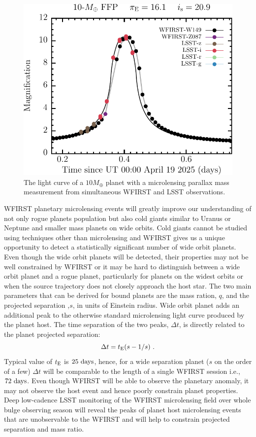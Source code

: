 \begin{figure}[t]
\centering\includegraphics[width=0.5\linewidth]{figs/WFIRST/lsst_lsstm+10_0_7220351_320_det_lc.pdf}
\caption{The light curve of a $10 M_{\oplus}$ planet with a microlensing parallax
mass measurement from simultaneous WFIRST and LSST observations.
\label{fig-lc}}
\end{figure}

WFIRST planetary microlensing events will greatly improve our 
understanding of not only rogue planets population but also cold giants similar to
Uranus or Neptune and smaller mass planets on wide orbits. Cold giants 
cannot be studied using techniques other than microlensing and 
WFIRST gives us a unique opportunity to detect a statistically significant 
number of wide orbit planets. Even though the wide orbit planets will be detected, 
their properties may not be well constrained by WFIRST or it may be hard to distinguish  
between a wide orbit planet and a rogue planet, particularly for planets on the widest 
orbits or when the source trajectory does not closely approach the host star.
The two main parameters that can be derived for bound planets are 
the mass ration, $q$, and the projected separation ,$s$, in units of Einstein radius. 
Wide orbit planet adds an additional peak to the otherwise 
standard microlensing light curve produced by the planet host. 
The time separation of the two peaks, $\Delta t$, is directly related 
to the planet projected separation:
\begin{equation}
 \Delta t =  t_{\rm E}(s - {1/s}) \ .
\end{equation}
Typical value of $t_{\rm E}$ is $25~{\rm days}$, hence, for a wide 
separation planet ($s$ on the order of a few) $\Delta t$ will be 
comparable to the length of a single WFIRST session i.e., $72~{\rm days}$.  
Even though WFIRST will be able to observe the planetary anomaly, 
it may not observe the host event and hence poorly constrain planet properties. Deep low-cadence LSST 
monitoring of the WFIRST microlensing field over whole bulge observing season 
will reveal the peaks of planet host microlensing events that are unobservable 
to the WFIRST and will help to constrain projected separation and mass ratio. 


